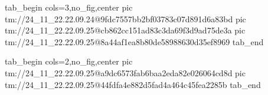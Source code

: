  
 
 
 
 

\qqSecCmtScr


\ifcmt
  tab_begin cols=3,no_fig,center
    pic tm://24_11_22.22.09.24@9fdc7557bb2bf03783c07d891d6a83bd
    pic tm://24_11_22.22.09.25@cb862cc151ad83c3da69f3d9ad75de3a
    pic tm://24_11_22.22.09.25@8a44af1ea8b80de58988630d35ef8969
  tab_end
\fi


\ifcmt
  tab_begin cols=2,no_fig,center
    pic tm://24_11_22.22.09.25@a9dc6573fab6baa2eda82e026064cd8d
    pic tm://24_11_22.22.09.25@44fdfa4e882d5fad4a464c45fea2285b
  tab_end
\fi


